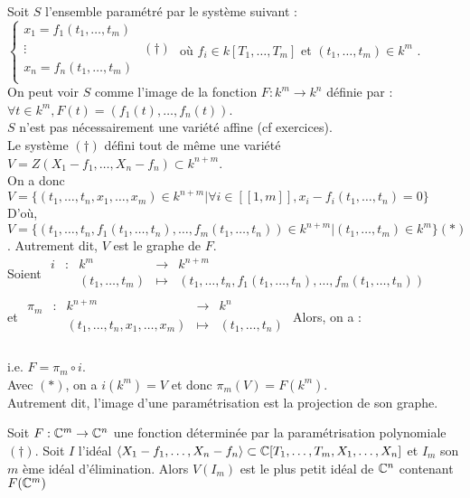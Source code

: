 Soit $S$ l'ensemble param\'etr\'e par le syst\`eme suivant : $ \begin{cases}
x_1=f_1(t_1,\ldots,t_m)& \\
\vdots & (\dagger) \\
x_n=f_n(t_1,\ldots,t_m)& \\
\end{cases} $ o\`u $f_i \in k[T_1,\ldots,T_m]$ et $(t_1,\ldots,t_m) \in k^m$ .\\
On peut voir $S$ comme l'image de la fonction $F : k^m \to k^n$ d\'efinie par : \\
$\forall t \in k^m, F(t)=(f_1(t),\ldots,f_n(t))$.\\
$S$ n'est pas n\'ecessairement une vari\'et\'e affine (cf exercices).\\
Le syst\`eme $(\dagger)$ d\'efini tout de même une vari\'et\'e $V=Z(X_1-f_1,\ldots,X_n-f_n) \subset k^{n+m}$.\\
On a donc $V=\{(t_1,\ldots,t_n,x_1,\ldots,x_m)\in k^{n+m} | \forall i \in [\![1,m]\!],x_i-f_i(t_1,\ldots,t_n)=0 \}$\\
D'o\`u,  $V=\{(t_1,\ldots,t_n,f_1(t_1,\ldots,t_n),\ldots,f_m(t_1,\ldots,t_n))\in k^{n+m} | (t_1,\ldots,t_m) \in k^m \} (*)$. Autrement dit, $V$ est le graphe de $F$.\\
Soient $\begin{array}{ccccc}
i & : & k^m & \to & k ^{n+m} \\
 & & (t_1,\ldots,t_m) & \mapsto & (t_1,\ldots,t_n,f_1(t_1,\ldots,t_n),\ldots,f_m(t_1,\ldots,t_n))\\
\end{array}$\\
 et $\begin{array}{ccccc}
\pi_m & : & k^{n+m} & \to & k^n \\
 & & (t_1,\ldots,t_n,x_1,\ldots,x_m) & \mapsto & (t_1,\ldots,t_n) \\
\end{array}$
Alors, on a : \\
 \\
i.e. $F=\pi_m \circ i$.\\
Avec $(*)$, on a $i(k^m)=V$ et donc $\pi_m(V)=F(k^m)$.\\
Autrement dit, l'image d'une param\'etrisation est la projection de son graphe.
\begin{Thm}
Soit $F:\mathbb{C}^m \to \mathbb{C}^n$ une fonction d\'etermin\'ee par la param\'etrisation polynomiale $(\dagger)$. Soit $I$ l'id\'eal $\left\langle X_1-f_1,\ldots,X_n-f_n \right\rangle \subset \mathbb{C}[T_1,\ldots,T_m,X_1,\ldots,X_n]$ et $I_m$ son $m$ \`eme id\'eal d'\'elimination. Alors $V(I_m)$ est le plus petit id\'eal de $\mathbb{C}^n$ contenant $F(\mathbb{C}^m)$
\end{Thm}